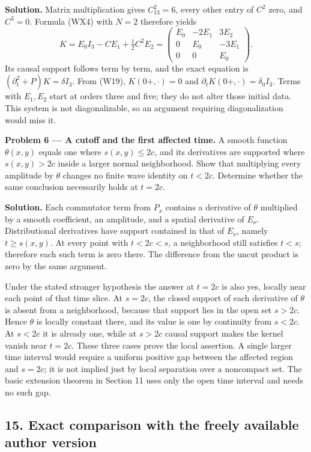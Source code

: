 \documentclass[
  11pt,
]{article}
\begin{document}
\textbf{Solution.} Matrix multiplication gives \(C^2_{13}=6\), every
other entry of \(C^2\) zero, and \(C^3=0\). Formula (WX4) with \(N=2\)
therefore yields \[
 K=E_0I_3-CE_1+\tfrac12C^2E_2
   =\begin{pmatrix}E_0&-2E_1&3E_2\\0&E_0&-3E_1\\0&0&E_0\end{pmatrix}.
 \tag{WP4}
\] Its causal support follows term by term, and the exact equation is
\((\partial_t^2+P)K=\delta I_3\). From (W19), \(K(0+,\cdot)=0\) and
\(\partial_tK(0+,\cdot)=\delta_0I_3\). Terms with \(E_1,E_2\) start at
orders three and five; they do not alter those initial data. This system
is not diagonalizable, so an argument requiring diagonalization would
miss it.

\textbf{Problem 6 --- A cutoff and the first affected time.} A smooth
function \(\theta(x,y)\) equals one where \(s(x,y)\leq2c\), and its
derivatives are supported where \(s(x,y)>2c\) inside a larger normal
neighborhood. Show that multiplying every amplitude by \(\theta\)
changes no finite wave identity on \(t<2c\). Determine whether the same
conclusion necessarily holds at \(t=2c\).

\textbf{Solution.} Each commutator term from \(P_x\) contains a
derivative of \(\theta\) multiplied by a smooth coefficient, an
amplitude, and a spatial derivative of \(E_\nu\). Distributional
derivatives have support contained in that of \(E_\nu\), namely
\(t\geq s(x,y)\). At every point with \(t<2c<s\), a neighborhood still
satisfies \(t<s\); therefore each such term is zero there. The
difference from the uncut product is zero by the same argument.

Under the stated stronger hypothesis the answer at \(t=2c\) is also yes,
locally near each point of that time slice. At \(s=2c\), the closed
support of each derivative of \(\theta\) is absent from a neighborhood,
because that support lies in the open set \(s>2c\). Hence \(\theta\) is
locally constant there, and its value is one by continuity from
\(s<2c\). At \(s<2c\) it is already one, while at \(s>2c\) causal
support makes the kernel vanish near \(t=2c\). These three cases prove
the local assertion. A single larger time interval would require a
uniform positive gap between the affected region and \(s=2c\); it is not
implied just by local separation over a noncompact set. The basic
extension theorem in Section 11 uses only the open time interval and
needs no such gap.

\subsection{15. Exact comparison with the freely available author
version}\label{exact-comparison-with-the-freely-available-author-version}
\end{document}

